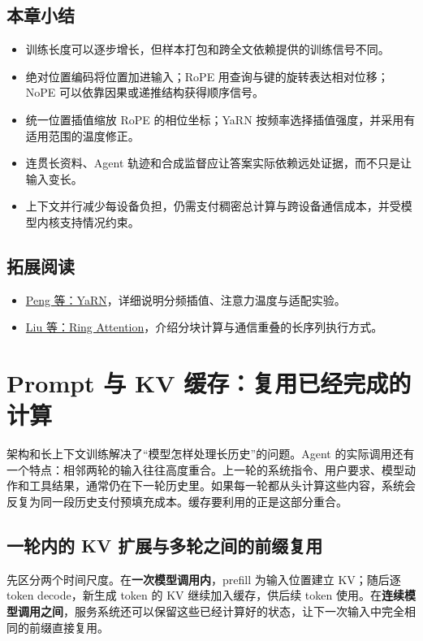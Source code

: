 \documentclass[11pt,a4paper]{article}
\begin{document}
\subsection{本章小结}
\begin{itemize}
  \item 训练长度可以逐步增长，但样本打包和跨全文依赖提供的训练信号不同。
  \item 绝对位置编码将位置加进输入；RoPE 用查询与键的旋转表达相对位移；NoPE 可以依靠因果或递推结构获得顺序信号。
  \item 统一位置插值缩放 RoPE 的相位坐标；YaRN 按频率选择插值强度，并采用有适用范围的温度修正。
  \item 连贯长资料、Agent 轨迹和合成监督应让答案实际依赖远处证据，而不只是让输入变长。
  \item 上下文并行减少每设备负担，仍需支付稠密总计算与跨设备通信成本，并受模型内核支持情况约束。
\end{itemize}

\subsection{拓展阅读}
\begin{itemize}
  \item \href{https://arxiv.org/abs/2309.00071}{Peng 等：YaRN}，详细说明分频插值、注意力温度与适配实验。
  \item \href{https://arxiv.org/abs/2310.01889}{Liu 等：Ring Attention}，介绍分块计算与通信重叠的长序列执行方式。
\end{itemize}


\clearpage
\section{Prompt 与 KV 缓存：复用已经完成的计算}

架构和长上下文训练解决了“模型怎样处理长历史”的问题。Agent 的实际调用还有一个特点：相邻两轮的输入往往高度重合。上一轮的系统指令、用户要求、模型动作和工具结果，通常仍在下一轮历史里。如果每一轮都从头计算这些内容，系统会反复为同一段历史支付预填充成本。缓存要利用的正是这部分重合。

\subsection{一轮内的 KV 扩展与多轮之间的前缀复用}

先区分两个时间尺度。在\textbf{一次模型调用内}，prefill 为输入位置建立 KV；随后逐 token decode，新生成 token 的 KV 继续加入缓存，供后续 token 使用。在\textbf{连续模型调用之间}，服务系统还可以保留这些已经计算好的状态，让下一次输入中完全相同的前缀直接复用。
\end{document}
